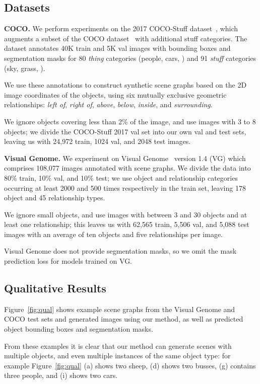 \documentclass[10pt,twocolumn,letterpaper]{article}
\begin{document}
\subsection{Datasets}

\textbf{COCO.}
We perform experiments on the 2017 COCO-Stuff dataset~\cite{caesar2016coco},
which augments a subset of the COCO dataset~\cite{lin2014microsoft} with
additional stuff categories.  The dataset annotates 40K train and 5K val images
with bounding boxes and segmentation masks for 80 \emph{thing} categories
(people, cars, \etc) and 91 \emph{stuff} categories (sky, grass, \etc).

We use these annotations to construct synthetic scene graphs based on the 2D
image coordinates of the objects, using six mutually exclusive geometric
relationships: \emph{left of}, \emph{right of}, \emph{above}, \emph{below},
\emph{inside}, and \emph{surrounding}.

We ignore objects covering less than 2\% of the image, and use images with 3 to
8 objects; we divide the COCO-Stuff 2017 val set into our own val and test sets,
leaving us with 24,972 train, 1024 val, and 2048 test images.

\textbf{Visual Genome.}
We experiment on Visual Genome~\cite{krishna2017visual} version 1.4 (VG) which
comprises 108,077 images annotated with scene graphs. We divide the data into
80\% train, 10\% val, and 10\% test; we use object and relationship categories
occurring at least 2000 and 500 times respectively in the train set, leaving
178 object and 45 relationship types.

We ignore small objects,
and use images with between 3 and 30 objects and at
least one relationship; this leaves us with 62,565 train, 5,506 val, and 5,088
test images with an average of ten objects and five relationships per image.

Visual Genome does not provide segmentation masks, so we omit the
mask prediction loss for models trained on VG.

\subsection{Qualitative Results}
Figure~\ref{fig:qual} shows example scene graphs from the Visual Genome and COCO
test sets and generated images using our method, as well as predicted object
bounding boxes and segmentation masks.

From these examples it is clear that our method can generate scenes with multiple
objects, and even multiple instances of the same object type: for example Figure~\ref{fig:qual} (a) shows two sheep, (d) shows two busses, (g) contains three 
people, and (i) shows two cars.
\end{document}

